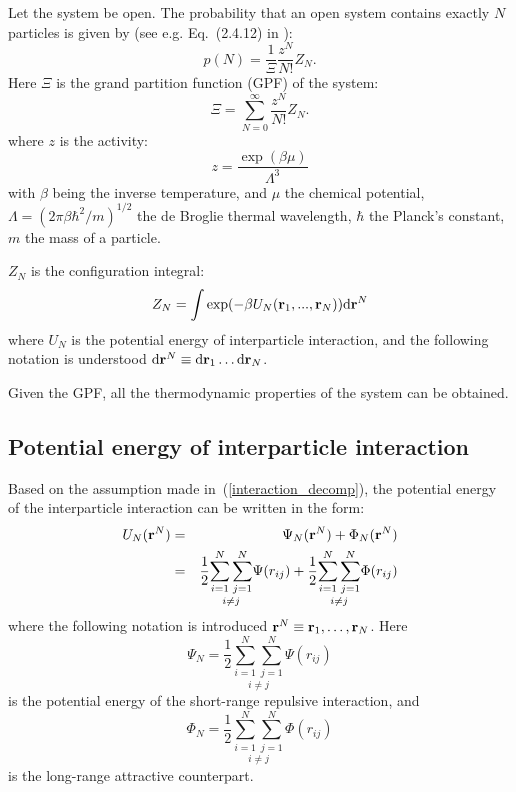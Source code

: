 Let the system be open. The probability that an open system contains exactly $N$ particles is given by (see e.g. Eq.~(2.4.12) in \cite{HANSEN2013ch2}):
\begin{equation}
p(N)=\frac{1}{\Xi}\frac{z^N}{N!}Z_N.
\end{equation}
Here $\Xi$ is the grand partition function (GPF) of the system:
\begin{equation}
\Xi=\sum_{N=0}^{\infty}\frac{z^N}{N!}Z_N.
\end{equation}
where $z$ is the activity:
\begin{equation}
	z = \frac{\exp(\beta\mu)}{\Lambda^3}
\end{equation}
with $\beta$ being the inverse temperature, and $\mu$ the chemical potential, $\Lambda = (2\pi\beta\hbar^2/m)^{1/2}$ the de Broglie thermal wavelength, $\hbar$ the Planck's constant, $m$ the mass of a particle.

$Z_N$ is the configuration integral:
\begin{equation}
	Z_N = \int\exp(-\beta U_N(\vb {r}_1,...,\vb{r}_N)){\rm d}\vb{r}^N
\end{equation}
where $U_N$ is the potential energy of interparticle interaction, and the following notation is understood ${\rm d} \vb{r}^N \equiv {\rm d}{\vb r_1} \dotsc {\rm d}{\vb r_N}$.

Given the GPF, all the thermodynamic properties of the system can be obtained.

\subsection{\label{sec:potential} Potential energy of interparticle interaction}

Based on the assumption made in~(\ref{interaction_decomp}), the potential energy of the interparticle interaction can be written in the form:
\begin{eqnarray}
	U_N(\vb r^N) &=& \Psi_N(\vb r^N) + \Phi_N (\vb r^N) 
	\nonumber\\
	&=&\frac12 \underset{i\neq j}{\sum_{i=1}^N \sum_{j=1}^N} \Psi(r_{ij}) 
	+ \frac12 \underset{i\neq j}{\sum_{i=1}^N \sum_{j=1}^N} \Phi(r_{ij})	
\end{eqnarray}
where the following notation is introduced $\vb r^N \equiv \vb r_1, \dotsc, \vb r_N$.
Here 
\begin{equation}
	\Psi_N = \frac12 \underset{i\neq j}{\sum_{i=1}^N \sum_{j=1}^N} \Psi(r_{ij})
\end{equation}
is the potential energy of the short-range repulsive interaction, and
\begin{equation}
	\Phi_N = \frac12 \underset{i\neq j}{\sum_{i=1}^N \sum_{j=1}^N} \Phi(r_{ij})
\end{equation}
is the long-range attractive counterpart.

